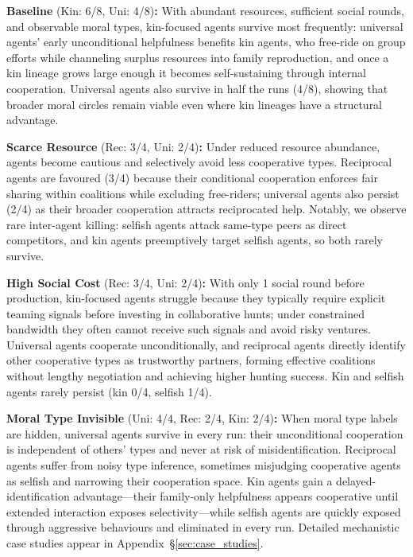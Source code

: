 \textbf{Baseline} (Kin: 6/8, Uni: 4/8)\textbf{:} With abundant resources, sufficient social rounds, and observable moral types, kin-focused agents survive most frequently: universal agents' early unconditional helpfulness benefits kin agents, who free-ride on group efforts while channeling surplus resources into family reproduction, and once a kin lineage grows large enough it becomes self-sustaining through internal cooperation. Universal agents also survive in half the runs (4/8), showing that broader moral circles remain viable even where kin lineages have a structural advantage.

\textbf{Scarce Resource} (Rec: 3/4, Uni: 2/4)\textbf{:} Under reduced resource abundance, agents become cautious and selectively avoid less cooperative types. Reciprocal agents are favoured (3/4) because their conditional cooperation enforces fair sharing within coalitions while excluding free-riders; universal agents also persist (2/4) as their broader cooperation attracts reciprocated help. Notably, we observe rare inter-agent killing: selfish agents attack same-type peers as direct competitors, and kin agents preemptively target selfish agents, so both rarely survive.

\textbf{High Social Cost} (Rec: 3/4, Uni: 2/4)\textbf{:} With only 1 social round before production, kin-focused agents struggle because they typically require explicit teaming signals before investing in collaborative hunts; under constrained bandwidth they often cannot receive such signals and avoid risky ventures. Universal agents cooperate unconditionally, and reciprocal agents directly identify other cooperative types as trustworthy partners, forming effective coalitions without lengthy negotiation and achieving higher hunting success. Kin and selfish agents rarely persist (kin 0/4, selfish 1/4).

\textbf{Moral Type Invisible} (Uni: 4/4, Rec: 2/4, Kin: 2/4)\textbf{:} When moral type labels are hidden, universal agents survive in every run: their unconditional cooperation is independent of others' types and never at risk of misidentification. Reciprocal agents suffer from noisy type inference, sometimes misjudging cooperative agents as selfish and narrowing their cooperation space. Kin agents gain a delayed-identification advantage---their family-only helpfulness appears cooperative until extended interaction exposes selectivity---while selfish agents are quickly exposed through aggressive behaviours and eliminated in every run. Detailed mechanistic case studies appear in Appendix~\S\ref{sec:case_studies}.

